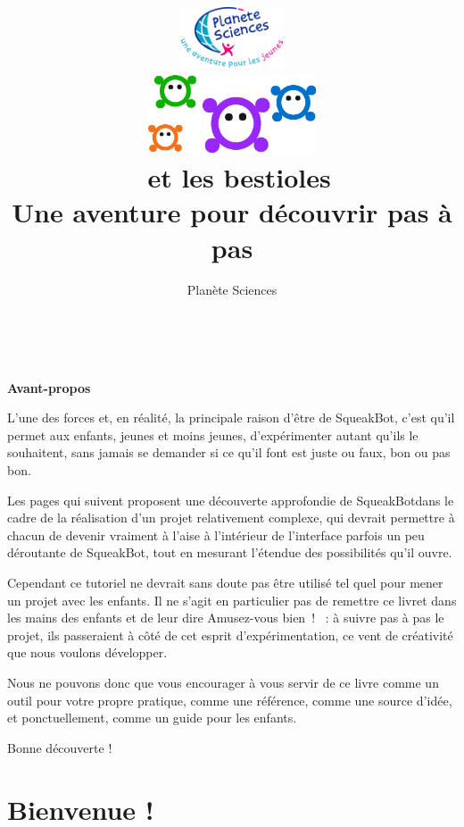 \documentclass[a4paper,12pt]{book}
\title{
	\includegraphics[width=3cm]{national.png}\\
	\vfill
	\includegraphics[width=5cm]{bestioles.png}\\
	\vspace{3em}
	\LARGE{\textbf{\appName~et les bestioles}}\\[1cm]
	\large{Une aventure pour découvrir pas à pas \appName}\\[1cm]
	\vfill
}
\author{
Planète Sciences
}
\def\appName{SqueakBot}
\begin{document}
\sffamily
\allsectionsfont{\sffamily}

\maketitle

\tableofcontents


\clearpage
~
\vfill
\begin{center}
    \LARGE{\textbf{Avant-propos}}
\end{center}

\vspace{3em}

L'une des forces et, en réalité, la principale raison d'être de \appName, c'est qu'il permet aux enfants, jeunes et moins jeunes, d'expérimenter autant qu'ils le souhaitent, sans jamais se demander si ce qu'il font est juste ou faux, bon ou pas bon.

Les pages qui suivent proposent une découverte approfondie de \appName dans le cadre de la réalisation d'un projet relativement complexe, qui devrait permettre à chacun de devenir vraiment à l'aise à l'intérieur de l'interface parfois un peu déroutante de \appName, tout en mesurant l'étendue des possibilités qu'il ouvre.

Cependant ce tutoriel ne devrait sans doute pas être utilisé tel quel pour mener un projet avec les enfants. Il ne s'agit en particulier pas de remettre ce livret dans les mains des enfants et de leur dire \og Amusez-vous bien~! \fg~: à suivre pas à pas le projet, ils passeraient à côté de cet esprit d'expérimentation, ce vent de créativité que nous voulons développer.

Nous ne pouvons donc que vous encourager à vous servir de ce livre comme un outil pour votre propre pratique, comme une référence, comme une source d'idée, et ponctuellement, comme un guide pour les enfants.

Bonne découverte !

\vfill

\chapter{Bienvenue !}
\end{document}
